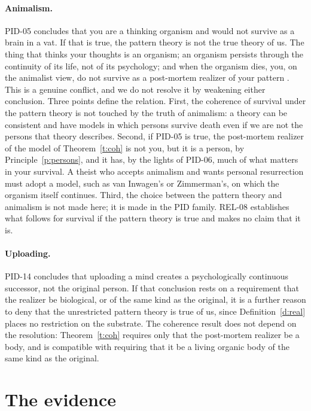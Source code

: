 \documentclass{situationist-preprint}
\begin{document}
\paragraph{Animalism.} PID-05 concludes that you are a thinking organism and would not survive as a brain in a vat. If that is true, the pattern theory is not the true theory of us. The thing that thinks your thoughts is an organism; an organism persists through the continuity of its life, not of its psychology; and when the organism dies, you, on the animalist view, do not survive as a post-mortem realizer of your pattern \citep{Olson1997}. This is a genuine conflict, and we do not resolve it by weakening either conclusion. Three points define the relation. First, the coherence of survival under the pattern theory is not touched by the truth of animalism: a theory can be consistent and have models in which persons survive death even if we are not the persons that theory describes. Second, if PID-05 is true, the post-mortem realizer of the model of Theorem~\ref{t:coh} is not you, but it is a person, by Principle~\ref{p:persons}, and it has, by the lights of PID-06, much of what matters in your survival. A theist who accepts animalism and wants personal resurrection must adopt a model, such as van Inwagen's or Zimmerman's, on which the organism itself continues. Third, the choice between the pattern theory and animalism is not made here; it is made in the PID family. REL-08 establishes what follows for survival if the pattern theory is true and makes no claim that it is.

\paragraph{Uploading.} PID-14 concludes that uploading a mind creates a psychologically continuous successor, not the original person. If that conclusion rests on a requirement that the realizer be biological, or of the same kind as the original, it is a further reason to deny that the unrestricted pattern theory is true of us, since Definition~\ref{d:real} places no restriction on the substrate. The coherence result does not depend on the resolution: Theorem~\ref{t:coh} requires only that the post-mortem realizer be a body, and is compatible with requiring that it be a living organic body of the same kind as the original.

\section{The evidence}\label{s:evid}
\end{document}
